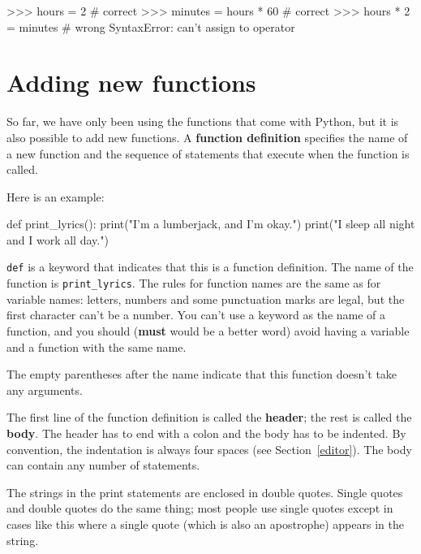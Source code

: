 \beforeverb
\begin{pyinterpreter}
>>> hours = 2              # correct
>>> minutes = hours * 60   # correct
>>> hours * 2 = minutes    # wrong
SyntaxError: can't assign to operator
\end{pyinterpreter}
\afterverb
%


\section{Adding new functions}

So far, we have only been using the functions that come with Python,
but it is also possible to add new functions.
A {\bf function definition} specifies the name of a new function and
the sequence of statements that execute when the function is called.


Here is an example:

\beforeverb
\begin{pycode}
def print_lyrics():
    print("I'm a lumberjack, and I'm okay.")
    print("I sleep all night and I work all day.")
\end{pycode}
\afterverb
%
{\tt def} is a keyword that indicates that this is a function
definition.  The name of the function is \verb"print_lyrics".  The
rules for function names are the same as for variable names: letters,
numbers and some punctuation marks are legal, but the first character
can't be a number.  You can't use a keyword as the name of a function,
and you should ({\bf must} would be a better word) avoid having a variable
and a function with the same name.


The empty parentheses after the name indicate that this function
doesn't take any arguments.


The first line of the function definition is called the {\bf header};
the rest is called the {\bf body}.  The header has to end with a colon
and the body has to be indented.  By convention, the indentation is
always four spaces (see Section~\ref{editor}).  The body can contain
any number of statements.

The strings in the print statements are enclosed in double
quotes.  Single quotes and double quotes do the same thing;
most people use single quotes except in cases like this where
a single quote (which is also an apostrophe) appears in the string.

